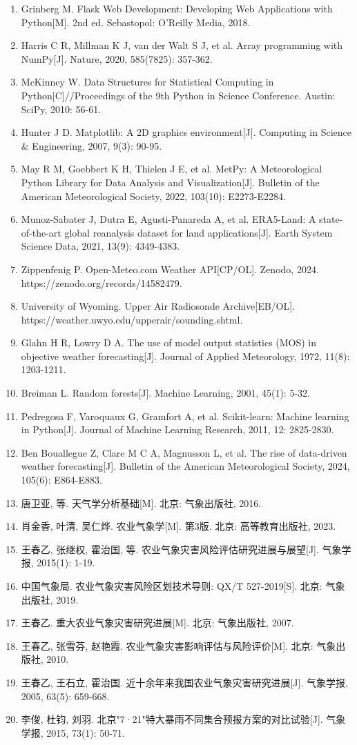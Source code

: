 \documentclass[12pt,a4paper]{ctexart}
\begin{document}
\begin{enumerate}
\item Grinberg M. Flask Web Development: Developing Web Applications with Python[M]. 2nd ed. Sebastopol: O'Reilly Media, 2018.
\item Harris C R, Millman K J, van der Walt S J, et al. Array programming with NumPy[J]. Nature, 2020, 585(7825): 357-362.
\item McKinney W. Data Structures for Statistical Computing in Python[C]//Proceedings of the 9th Python in Science Conference. Austin: SciPy, 2010: 56-61.
\item Hunter J D. Matplotlib: A 2D graphics environment[J]. Computing in Science \& Engineering, 2007, 9(3): 90-95.
\item May R M, Goebbert K H, Thielen J E, et al. MetPy: A Meteorological Python Library for Data Analysis and Visualization[J]. Bulletin of the American Meteorological Society, 2022, 103(10): E2273-E2284.
\item Munoz-Sabater J, Dutra E, Agusti-Panareda A, et al. ERA5-Land: A state-of-the-art global reanalysis dataset for land applications[J]. Earth System Science Data, 2021, 13(9): 4349-4383.
\item Zippenfenig P. Open-Meteo.com Weather API[CP/OL]. Zenodo, 2024. https://zenodo.org/records/14582479.
\item University of Wyoming. Upper Air Radiosonde Archive[EB/OL]. https://weather.uwyo.edu/upperair/sounding.shtml.
\item Glahn H R, Lowry D A. The use of model output statistics (MOS) in objective weather forecasting[J]. Journal of Applied Meteorology, 1972, 11(8): 1203-1211.
\item Breiman L. Random forests[J]. Machine Learning, 2001, 45(1): 5-32.
\item Pedregosa F, Varoquaux G, Gramfort A, et al. Scikit-learn: Machine learning in Python[J]. Journal of Machine Learning Research, 2011, 12: 2825-2830.
\item Ben Bouallegue Z, Clare M C A, Magnusson L, et al. The rise of data-driven weather forecasting[J]. Bulletin of the American Meteorological Society, 2024, 105(6): E864-E883.
\item 唐卫亚, 等. 天气学分析基础[M]. 北京: 气象出版社, 2016.
\item 肖金香, 叶清, 吴仁烨. 农业气象学[M]. 第3版. 北京: 高等教育出版社, 2023.
\item 王春乙, 张继权, 霍治国, 等. 农业气象灾害风险评估研究进展与展望[J]. 气象学报, 2015(1): 1-19.
\item 中国气象局. 农业气象灾害风险区划技术导则: QX/T 527-2019[S]. 北京: 气象出版社, 2019.
\item 王春乙. 重大农业气象灾害研究进展[M]. 北京: 气象出版社, 2007.
\item 王春乙, 张雪芬, 赵艳霞. 农业气象灾害影响评估与风险评价[M]. 北京: 气象出版社, 2010.
\item 王春乙, 王石立, 霍治国. 近十余年来我国农业气象灾害研究进展[J]. 气象学报, 2005, 63(5): 659-668.
\item 李俊, 杜钧, 刘羽. 北京"7·21"特大暴雨不同集合预报方案的对比试验[J]. 气象学报, 2015, 73(1): 50-71.
\end{enumerate}
\end{document}
